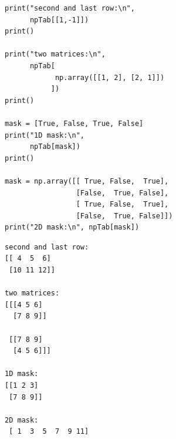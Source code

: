 \begin{frame}[fragile]
%
\begin{tcbraster}[raster columns=2,
                  raster equal height,
                  nobeforeafter,
                  raster column skip=0.2cm]
\begin{codebox}[... continued]
\begin{verbatim}
print("second and last row:\n",
      npTab[[1,-1]])
print()

print("two matrices:\n",
      npTab[
            np.array([[1, 2], [2, 1]])
           ])
print()

mask = [True, False, True, False]
print("1D mask:\n",
      npTab[mask])
print()

mask = np.array([[ True, False,  True],
                 [False,  True, False],
                 [ True, False,  True],
                 [False,  True, False]])
print("2D mask:\n", npTab[mask])
\end{verbatim}
\end{codebox}
%
\begin{cmdbox}[... continued]
\begin{verbatim}
second and last row:
[[ 4  5  6]
 [10 11 12]]

two matrices:
[[[4 5 6]
  [7 8 9]]

 [[7 8 9]
  [4 5 6]]]

1D mask:
[[1 2 3]
 [7 8 9]]

2D mask:
 [ 1  3  5  7  9 11]
\end{verbatim}
\end{cmdbox}
\end{tcbraster}
%
\end{frame}


